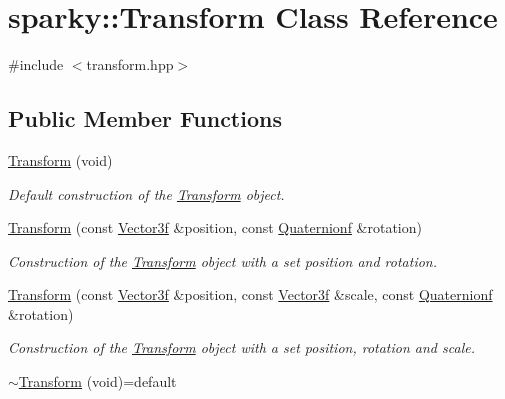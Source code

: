 \hypertarget{classsparky_1_1_transform}{}\section{sparky\+:\+:Transform Class Reference}
\label{classsparky_1_1_transform}


{\ttfamily \#include $<$transform.\+hpp$>$}

\subsection*{Public Member Functions}
\begin{DoxyCompactItemize}
\item 
\hyperlink{classsparky_1_1_transform_abf5ec0c413c17786ce73f2b2071dbfc6}{Transform} (void)
\begin{DoxyCompactList}\small\item\em Default construction of the \hyperlink{classsparky_1_1_transform}{Transform} object. \end{DoxyCompactList}\item 
\hyperlink{classsparky_1_1_transform_ab769f038ba7536105ff683fffd58054d}{Transform} (const \hyperlink{classsparky_1_1_vector3}{Vector3f} \&position, const \hyperlink{classsparky_1_1_quaternion}{Quaternionf} \&rotation)
\begin{DoxyCompactList}\small\item\em Construction of the \hyperlink{classsparky_1_1_transform}{Transform} object with a set position and rotation. \end{DoxyCompactList}\item 
\hyperlink{classsparky_1_1_transform_ae221098b15225b919719b1ebb7f6b393}{Transform} (const \hyperlink{classsparky_1_1_vector3}{Vector3f} \&position, const \hyperlink{classsparky_1_1_vector3}{Vector3f} \&scale, const \hyperlink{classsparky_1_1_quaternion}{Quaternionf} \&rotation)
\begin{DoxyCompactList}\small\item\em Construction of the \hyperlink{classsparky_1_1_transform}{Transform} object with a set position, rotation and scale. \end{DoxyCompactList}\item 
\hyperlink{classsparky_1_1_transform_a5c9b5691d54c9572e67d560a82a0d483}{$\sim$\+Transform} (void)=default\hypertarget{classsparky_1_1_transform_a5c9b5691d54c9572e67d560a82a0d483}{}\label{classsparky_1_1_transform_a5c9b5691d54c9572e67d560a82a0d483}


\end{DoxyCompactItemize}
